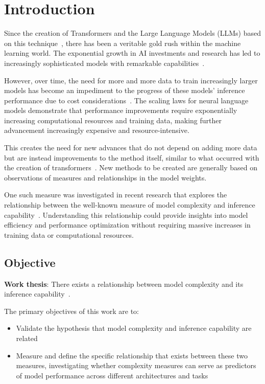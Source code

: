\section{Introduction}

    Since the creation of Transformers and the Large Language Models (LLMs) based on this technique~\cite{vaswani2017attention}, there has been a veritable gold rush within the machine learning world. The exponential growth in AI investments and research has led to increasingly sophisticated models with remarkable capabilities~\cite{brown2020language, bubeck2023sparks}.

    However, over time, the need for more and more data to train increasingly larger models has become an impediment to the progress of these models' inference performance due to cost considerations~\cite{kaplan2020scaling, hoffmann2022training}. The scaling laws for neural language models demonstrate that performance improvements require exponentially increasing computational resources and training data, making further advancement increasingly expensive and resource-intensive.

    This creates the need for new advances that do not depend on adding more data but are instead improvements to the method itself, similar to what occurred with the creation of transformers~\cite{vaswani2017attention}. New methods to be created are generally based on observations of measures and relationships in the model weights.

    One such measure was investigated in recent research that explores the relationship between the well-known measure of model complexity and inference capability~\cite{murta2025complexity}. Understanding this relationship could provide insights into model efficiency and performance optimization without requiring massive increases in training data or computational resources.

    \subsection{Objective}

        \textbf{Work thesis}: There exists a relationship between model complexity and its inference capability~\cite{murta2025complexity}.

        The primary objectives of this work are to:
        \begin{itemize}
            \item Validate the hypothesis that model complexity and inference capability are related
            \item Measure and define the specific relationship that exists between these two measures, investigating whether complexity measures can serve as predictors of model performance across different architectures and tasks
        \end{itemize}